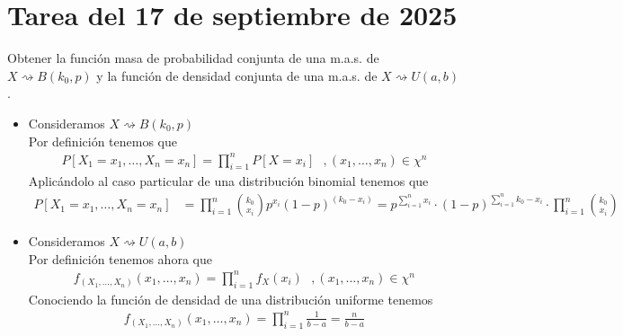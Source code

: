 \section{Tarea del 17 de septiembre de 2025}

\begin{ejercicio}
    Obtener la función masa de probabilidad conjunta de una m.a.s. de $X \rightsquigarrow B(k_0,p)$ y la función de densidad conjunta de una m.a.s. de $X \rightsquigarrow U(a,b)$.\\

    \begin{itemize}
        \item Consideramos $X \rightsquigarrow B(k_0,p)$\\
        
        Por definición tenemos que 
        \begin{gather*}
            P[X_1=x_1, \dots, X_n = x_n] = \prod_{i=1}^{n} P[X=x_i]\ \ \ ,(x_1, \dots,x_n) \in \chi^n 
        \end{gather*}
        Aplicándolo al caso particular de una distribución binomial tenemos que
        \begin{align*}
            P[X_1=x_1, \dots, X_n = x_n] &= \prod_{i=1}^{n} \binom{k_0}{x_i} p^{x_i} (1-p)^{(k_0-x_i)} = p^{\sum\limits_{i=1}^n x_i} \cdot (1-p)^{\sum\limits_{i=1}^n k_0 - x_i} \cdot \prod_{i=1}^{n} \binom{k_0}{x_i}
        \end{align*}

        \item Consideramos $X \rightsquigarrow U(a,b)$\\
        
        Por definición tenemos ahora que
        \begin{gather*}
            f_{(X_1,\dots,X_n)}(x_1,\dots,x_n) = \prod_{i=1}^n f_X(x_i)\ \ \ ,(x_1, \dots,x_n) \in \chi^n 
        \end{gather*}
        Conociendo la función de densidad de una distribución uniforme tenemos
        \begin{gather*}
            f_{(X_1,\dots,X_n)}(x_1,\dots,x_n) = \prod_{i=1}^n \frac{1}{b-a} = \frac{n}{b-a}
        \end{gather*}
    \end{itemize}
\end{ejercicio}

